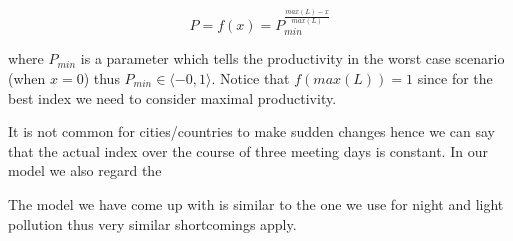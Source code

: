 $$P = f(x) = P_{min}^{\frac{max(L)-x}{max(L)}}$$

\noindent where $P_{min}$ is a parameter which tells the productivity in the worst case scenario  (when $x=0$) thus $ P_{min}\in \langle -0,1\rangle$. Notice that $f(max(L))=1$ since for the best index we need to consider maximal productivity.

It is not common for cities/countries to make sudden changes hence we can say that the actual index over the course of three meeting days is constant. In our model we also regard the 


The model we have come up with is similar to the one we use for night and light pollution thus very similar shortcomings apply. 





